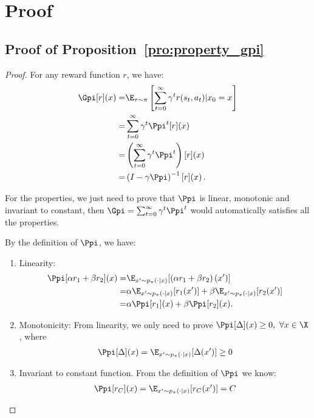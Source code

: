 \clearpage
\onecolumn
\appendix

\section{Proof}
\label{sec:appendix_proof}


\subsection{Proof of Proposition~\ref{pro:property_gpi}}
\begin{proof}
For any reward function $r$, we have:
\begin{align*}
    \Gpi[r](x) =& \E_{\tau \sim \pi} 
    \left [\sum_{t=0}^{\infty} \gamma^t r(s_t, a_t)|x_0 = x \right ] \\
    =& \sum_{t=0}^{\infty} \gamma^t \Ppi^t[r](x) \\
    =& \left(\sum_{t=0}^{\infty} \gamma^t \Ppi^t\right)[r](x) \\
    =& \left(I-\gamma\Ppi\right)^{-1} [r](x)\,.
\end{align*}

For the properties, we just need to prove that $\Ppi$ is linear, monotonic and invariant to constant, then $\Gpi = \sum_{t=0}^{\infty} \gamma^t \Ppi^t$ would automatically satisfies all the properties.

By the definition of $\Ppi$, we have:
\begin{enumerate}
    \item Linearity:
    \begin{align*}
        \Ppi[\alpha r_1 + \beta r_2](x) =& \E_{x'\sim p_\pi(\cdot|x)}[\left(\alpha r_1 + \beta r_2\right)(x')] \\
        =& \alpha\E_{x'\sim p_\pi(\cdot|x)}[r_1(x')] + \beta \E_{x'\sim p_\pi(\cdot|x)}[r_2(x')] \\
        =& \alpha\Ppi[r_1](x) + \beta\Ppi[r_2](x).
    \end{align*}
    \item Monotonicity: From linearity, we only need to prove $\Ppi[\Delta](x) \geq 0,~\forall x\in \X$, where
    \begin{align*}
        \Ppi[\Delta](x) = \E_{x'\sim p_\pi(\cdot|x)}[\Delta(x')] \geq 0
    \end{align*}
    \item Invariant to constant function. From the definition of $\Ppi$ we know:
    \begin{align*}
        \Ppi[r_C](x) = \E_{x'\sim p_\pi(\cdot|x)}[r_C(x')] = C
    \end{align*}
\end{enumerate}
\end{proof}

